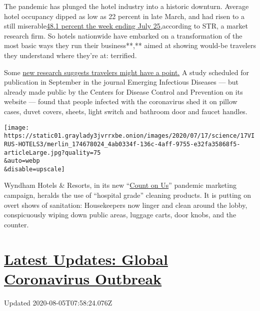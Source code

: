 The pandemic has plunged the hotel industry into a historic downturn.
Average hotel occupancy dipped as low as 22 percent in late March, and
had risen to a still
miserable\href{https://str.com/press-release/str-us-hotel-results-week-ending-25-july}{48.1
percent the week ending July
25,}\href{https://str.com/press-release/str-canada-hotel-results-week-ending-4-july}{}according
to STR, a market research firm. So hotels nationwide have embarked on a
transformation of the most basic ways they run their business**,** aimed
at showing would-be travelers they understand where they're at:
terrified.

Some \href{https://wwwnc.cdc.gov/eid/article/26/9/20-1435_article}{new
research suggests travelers might have a point.} A study scheduled for
publication in September in the journal Emerging Infectious Diseases ---
but already made public by the Centers for Disease Control and
Prevention on its website --- found that people infected with the
coronavirus shed it on pillow cases, duvet covers, sheets, light switch
and bathroom door and faucet handles.

\texttt{[image: https://static01.graylady3jvrrxbe.onion/images/2020/07/17/science/17VIRUS-HOTELS3/merlin\_174678024\_4ab0334f-136c-4aff-9755-e32fa35868f5-articleLarge.jpg?quality=75\\\&auto=webp\\\&disable=upscale]}

Wyndham Hotels \& Resorts, in its new
``\href{https://www.wyndhamhotels.com/about-us/count-on-us}{Count on
Us}'' pandemic marketing campaign, heralds the use of ``hospital grade''
cleaning products. It is putting on overt shows of sanitation:
Housekeepers now linger and clean around the lobby, conspicuously wiping
down public areas, luggage carts, door knobs, and the counter.

\hypertarget{latest-updates-global-coronavirus-outbreak}{%
\section{\texorpdfstring{\href{https://www.nytimes3xbfgragh.onion/2020/08/04/world/coronavirus-cases.html?action=click\&pgtype=Article\&state=default\&region=MAIN_CONTENT_1\&context=storylines_live_updates}{Latest
Updates: Global Coronavirus
Outbreak}}{Latest Updates: Global Coronavirus Outbreak}}\label{latest-updates-global-coronavirus-outbreak}}

Updated 2020-08-05T07:58:24.076Z

